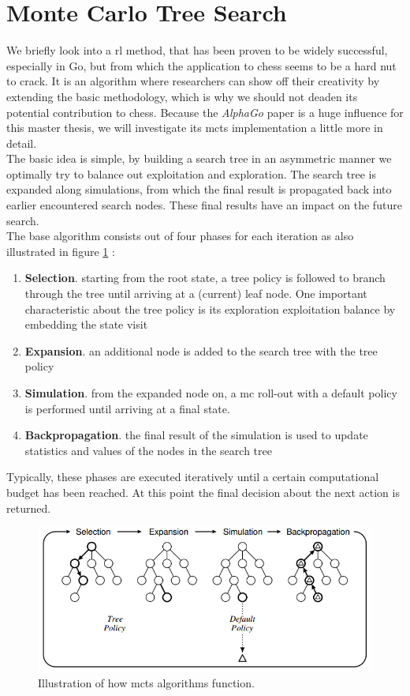 \section{Monte Carlo Tree Search}
\label{sec:mcts}
We briefly look into a \gls{rl} method,  that has been proven to be widely successful, especially in Go, but from which the application to chess seems to be a hard nut to crack. It is an algorithm where researchers can show off their creativity by extending the basic methodology, which is why we should not deaden its potential contribution to chess. Because the \textit{AlphaGo} paper is a huge influence for this master thesis, we will investigate its \gls{mcts} implementation a little more in detail.\\
The basic idea is simple, by building a search tree in an asymmetric manner we optimally try to balance out exploitation and exploration. The search tree is expanded along simulations, from which the final result is propagated back into earlier encountered search nodes. These final results have an impact on the future search. \\ 
The base algorithm consists out of four phases for each iteration as also illustrated in figure \ref{fig:mcts} \cite{browne12}:
\begin{enumerate}
\item \textbf{Selection}. starting from the root state, a tree policy is followed to branch through the tree until arriving at a (current) leaf node. One important characteristic about the tree policy is its exploration exploitation balance by embedding the state visit
\item \textbf{Expansion}. an additional node is added to the search tree with the tree policy
\item \textbf{Simulation}. from the expanded node on, a \gls{mc} roll-out with a default policy is performed until arriving at a final state.
\item \textbf{Backpropagation}. the final result of the simulation is used to update statistics and values of the nodes in the search tree
\end{enumerate}
Typically, these phases are executed iteratively until a certain computational budget has been reached. At this point the final decision about the next action is returned.

\begin{figure}
\includegraphics[width=\linewidth]{fig/mcts}
\caption[\gls{mcts}]{Illustration of how \gls{mcts} algorithms function.}
\label{fig:mcts}
\end{figure}

